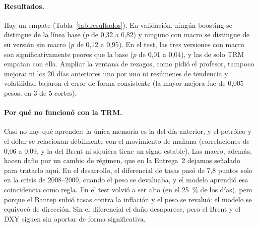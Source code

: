 \documentclass[11pt,letterpaper]{article}
\begin{document}
\begin{table}[!htbp]
\centering\footnotesize
\setlength{\tabcolsep}{4pt}
\caption{Resultados. RMSE y MAE (error absoluto medio) en pesos; $R^2$ sobre retornos. $p$ DM: prueba de Diebold-Mariano frente a la línea base (validación: 3.600 días; test: 1.080 días). En negrita, el menor RMSE de cada bloque.}
\label{tab:resultados}
\resizebox{\textwidth}{!}{}
\end{table}

\paragraph{Resultados.} Hay un empate (Tabla~\ref{tab:resultados}). En validación, ningún boosting se distingue de la línea base ($p$ de 0,32 a 0,82) y ninguno con macro se distingue de su versión sin macro ($p$ de 0,12 a 0,95). En el test, las tres versiones con macro son significativamente peores que la base ($p$ de 0,01 a 0,04), y las de solo TRM empatan con ella. Ampliar la ventana de rezagos, como pidió el profesor, tampoco mejora: ni los 20 días anteriores uno por uno ni resúmenes de tendencia y volatilidad bajaron el error de forma consistente (la mayor mejora fue de 0,005 pesos, en 3 de 5 cortes).

\paragraph{Por qué no funcionó con la TRM.} Casi no hay qué aprender: la única memoria es la del día anterior, y el petróleo y el dólar se relacionan débilmente con el movimiento de mañana (correlaciones de 0,06 a 0,09, y la del Brent ni siquiera tiene un signo estable). Las macro, además, hacen daño por un cambio de régimen, que en la Entrega~2 dejamos señalado para tratarlo aquí. En el desarrollo, el diferencial de tasas pasó de 7,8 puntos solo en la crisis de 2008--2009, cuando el peso se devaluaba, y el modelo aprendió esa coincidencia como regla. En el test volvió a ser alto (en el 25~\% de los días), pero porque el Banrep subió tasas contra la inflación y el peso se revaluó: el modelo se equivocó de dirección. Sin el diferencial el daño desaparece, pero el Brent y el DXY siguen sin aportar de forma significativa.
\end{document}
